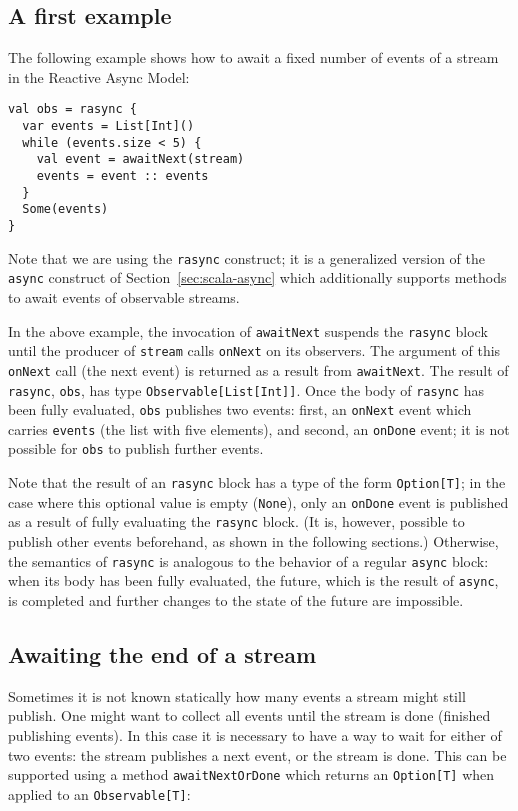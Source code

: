 \documentclass{acm_proc_article-sp}
\begin{document}
\subsection{A first example}

The following example shows how to await a fixed number of events of a stream
in the Reactive Async Model:

\begin{lstlisting}
val obs = rasync {
  var events = List[Int]()
  while (events.size < 5) {
    val event = awaitNext(stream)
    events = event :: events
  }
  Some(events)
}
\end{lstlisting}

Note that we are using the \verb|rasync| construct; it is a generalized
version of the \verb|async| construct of Section~\ref{sec:scala-async} which
additionally supports methods to await events of observable streams.

In the above example, the invocation of \verb|awaitNext| suspends the
\verb|rasync| block until the producer of \verb|stream| calls \verb|onNext| on
its observers. The argument of this \verb|onNext| call (the next event) is
returned as a result from \verb|awaitNext|. The result of \verb|rasync|,
\verb|obs|, has type \verb|Observable[List[Int]]|. Once the body of
\verb|rasync| has been fully evaluated, \verb|obs| publishes two events:
first, an \verb|onNext| event which carries \verb|events| (the list with five
elements), and second, an \verb|onDone| event; it is not possible for
\verb|obs| to publish further events.

Note that the result of an \verb|rasync| block has a type of the form
\verb|Option[T]|; in the case where this optional value is empty
(\verb|None|), only an \verb|onDone| event is published as a result of fully
evaluating the \verb|rasync| block. (It is, however, possible to publish other
events beforehand, as shown in the following sections.) Otherwise, the
semantics of \verb|rasync| is analogous to the behavior of a regular
\verb|async| block: when its body has been fully evaluated, the future, which
is the result of \verb|async|, is completed and further changes to the state
of the future are impossible.


\subsection{Awaiting the end of a stream}

Sometimes it is not known statically how many events a stream might still
publish. One might want to collect all events until the stream is done
(finished publishing events). In this case it is necessary to have a way to
wait for either of two events: the stream publishes a next event, or the
stream is done. This can be supported using a method \verb|awaitNextOrDone|
which returns an \verb|Option[T]| when applied to an \verb|Observable[T]|:
\end{document}
